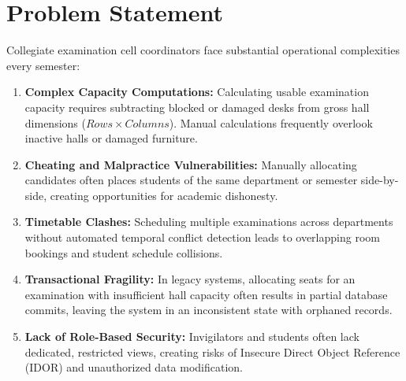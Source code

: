 \documentclass{InternshipReport}
\begin{document}
\section{Problem Statement}
Collegiate examination cell coordinators face substantial operational complexities every semester:
\begin{enumerate}[label=\alph*.]
    \item \textbf{Complex Capacity Computations:} Calculating usable examination capacity requires subtracting blocked or damaged desks from gross hall dimensions ($Rows \times Columns$). Manual calculations frequently overlook inactive halls or damaged furniture.
    \item \textbf{Cheating and Malpractice Vulnerabilities:} Manually allocating candidates often places students of the same department or semester side-by-side, creating opportunities for academic dishonesty.
    \item \textbf{Timetable Clashes:} Scheduling multiple examinations across departments without automated temporal conflict detection leads to overlapping room bookings and student schedule collisions.
    \item \textbf{Transactional Fragility:} In legacy systems, allocating seats for an examination with insufficient hall capacity often results in partial database commits, leaving the system in an inconsistent state with orphaned records.
    \item \textbf{Lack of Role-Based Security:} Invigilators and students often lack dedicated, restricted views, creating risks of Insecure Direct Object Reference (IDOR) and unauthorized data modification.
\end{enumerate}
\end{document}
